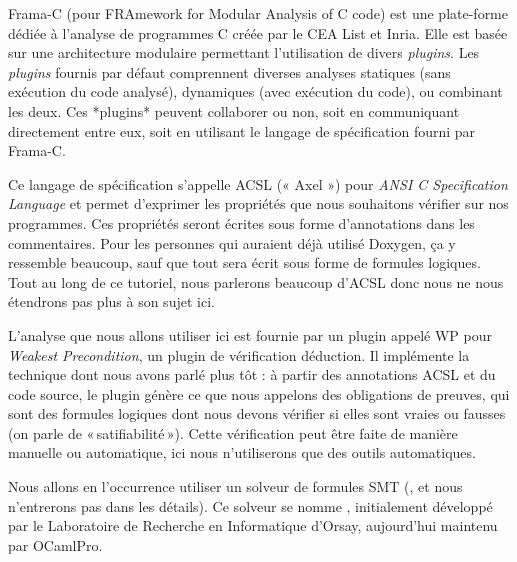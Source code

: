 





Frama-C (pour FRAmework for Modular Analysis of C code) est une plate-forme
 dédiée à l'analyse de programmes C créée par le CEA List et Inria. Elle est
 basée sur une architecture modulaire permettant l'utilisation de divers
 \textit{plugins}. Les \textit{plugins} fournis par défaut comprennent diverses
 analyses statiques (sans exécution du code analysé), dynamiques (avec
 exécution du code), ou combinant les deux. Ces *plugins* peuvent collaborer
 ou non, soit en communiquant directement entre eux, soit en utilisant le
 langage de spécification fourni par Frama-C.



Ce langage de spécification s'appelle ACSL (« Axel »)
pour \textit{ANSI C Specification Language} et permet d'exprimer les
propriétés que nous souhaitons vérifier sur nos programmes. Ces propriétés seront
écrites sous forme d'annotations dans les commentaires. Pour les personnes qui
auraient déjà utilisé Doxygen, ça y ressemble beaucoup, sauf que tout sera
écrit sous forme de formules logiques. Tout au long de ce tutoriel, nous parlerons
beaucoup d'ACSL donc nous ne nous étendrons pas plus à son sujet ici.



L'analyse que nous allons utiliser ici est fournie par un plugin appelé WP pour
\textit{Weakest Precondition}, un plugin de vérification déduction. Il implémente
la technique dont nous avons parlé plus tôt :
à partir des annotations ACSL et du code source, le plugin génère ce que nous
appelons des obligations de preuves, qui sont des formules logiques dont nous
devons vérifier si elles sont vraies ou fausses (on parle de « satifiabilité »).
Cette vérification peut être faite de manière
manuelle ou automatique, ici nous n'utiliserons que des outils automatiques.



Nous allons en l'occurrence utiliser un solveur de formules SMT
(,
et nous n'entrerons pas dans les détails). Ce solveur se nomme
, initialement développé par le Laboratoire
de Recherche en Informatique d'Orsay, aujourd'hui maintenu par
OCamlPro.






